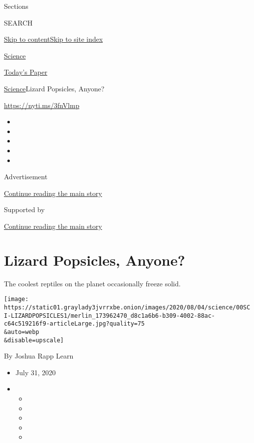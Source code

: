 Sections

SEARCH

\protect\hyperlink{site-content}{Skip to
content}\protect\hyperlink{site-index}{Skip to site index}

\href{https://www.nytimes3xbfgragh.onion/section/science}{Science}

\href{https://myaccount.nytimes3xbfgragh.onion/auth/login?response_type=cookie\&client_id=vi}{}

\href{https://www.nytimes3xbfgragh.onion/section/todayspaper}{Today's
Paper}

\href{/section/science}{Science}\textbar{}Lizard Popsicles, Anyone?

\url{https://nyti.ms/3fnVlmp}

\begin{itemize}
\item
\item
\item
\item
\item
\end{itemize}

Advertisement

\protect\hyperlink{after-top}{Continue reading the main story}

Supported by

\protect\hyperlink{after-sponsor}{Continue reading the main story}

\hypertarget{lizard-popsicles-anyone}{%
\section{Lizard Popsicles, Anyone?}\label{lizard-popsicles-anyone}}

The coolest reptiles on the planet occasionally freeze solid.

\texttt{[image: https://static01.graylady3jvrrxbe.onion/images/2020/08/04/science/00SCI-LIZARDPOPSICLES1/merlin\_173962470\_d8c1a6b6-b309-4002-88ac-c64c519216f9-articleLarge.jpg?quality=75\\\&auto=webp\\\&disable=upscale]}

By Joshua Rapp Learn

\begin{itemize}
\item
  July 31, 2020
\item
  \begin{itemize}
  \item
  \item
  \item
  \item
  \item
  \end{itemize}
\end{itemize}

